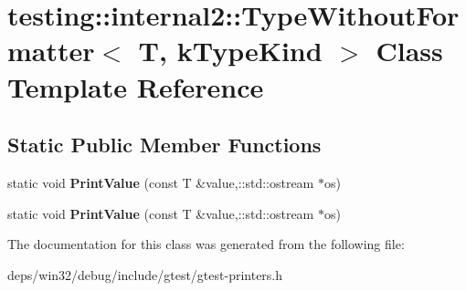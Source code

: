 \hypertarget{classtesting_1_1internal2_1_1_type_without_formatter}{}\section{testing\+:\+:internal2\+:\+:Type\+Without\+Formatter$<$ T, k\+Type\+Kind $>$ Class Template Reference}
\label{classtesting_1_1internal2_1_1_type_without_formatter}
\subsection*{Static Public Member Functions}
\begin{DoxyCompactItemize}
\item 
\hypertarget{classtesting_1_1internal2_1_1_type_without_formatter_a6c377c9580fce3a0226911417053f417}{}static void {\bfseries Print\+Value} (const T \&value,\+::std\+::ostream $\ast$os)\label{classtesting_1_1internal2_1_1_type_without_formatter_a6c377c9580fce3a0226911417053f417}

\item 
\hypertarget{classtesting_1_1internal2_1_1_type_without_formatter_a6c377c9580fce3a0226911417053f417}{}static void {\bfseries Print\+Value} (const T \&value,\+::std\+::ostream $\ast$os)\label{classtesting_1_1internal2_1_1_type_without_formatter_a6c377c9580fce3a0226911417053f417}

\end{DoxyCompactItemize}


The documentation for this class was generated from the following file\+:\begin{DoxyCompactItemize}
\item 
deps/win32/debug/include/gtest/gtest-\/printers.\+h\end{DoxyCompactItemize}
